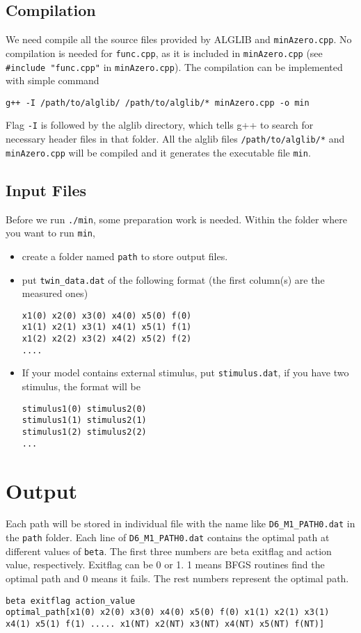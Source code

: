 \documentclass[11pt]{article}
\begin{document}
\subsection{Compilation}
We need compile all the source files provided by ALGLIB and \texttt{minAzero.cpp}.  No compilation is needed for \texttt{func.cpp}, as it is included in \texttt{minAzero.cpp} (see \texttt{\#include "func.cpp"} in \texttt{minAzero.cpp}). The compilation can be implemented with simple command 
\begin{verbatim}
g++ -I /path/to/alglib/ /path/to/alglib/* minAzero.cpp -o min
\end{verbatim}
Flag \texttt{-I} is followed by the alglib directory, which tells g++ to search for necessary header files in that folder. All the alglib files \texttt{/path/to/alglib/*} and \texttt{minAzero.cpp} will be compiled and it generates the executable file \texttt{min}.
\subsection{Input Files}
Before we run \texttt{./min}, some preparation work is needed. Within the folder where you want to run \texttt{min}, 
\begin{itemize}
\item create a folder named \texttt{path}  to store output files.
\item put \texttt{twin\_data.dat} of the following format (the first  column(s) are the measured ones)
\begin{verbatim}
x1(0) x2(0) x3(0) x4(0) x5(0) f(0)
x1(1) x2(1) x3(1) x4(1) x5(1) f(1)
x1(2) x2(2) x3(2) x4(2) x5(2) f(2)
....
\end{verbatim}
\item If your model contains external stimulus, put \texttt{stimulus.dat}, if you have two stimulus, the format will be
\begin{verbatim}
stimulus1(0) stimulus2(0) 
stimulus1(1) stimulus2(1) 
stimulus1(2) stimulus2(2)
...
\end{verbatim}
\end{itemize}
\section{Output}
Each path will be stored in individual file with the name like \texttt{D6\_M1\_PATH0.dat} in the \texttt{path} folder.  Each line of  \texttt{D6\_M1\_PATH0.dat} contains the optimal path at different values of \texttt{beta}. The first three numbers are beta exitflag and action value, respectively. Exitflag can be 0 or 1. 1 means BFGS routines find the optimal path and 0 means it fails. The rest numbers represent the optimal path.
\begin{verbatim}
beta exitflag action_value 
optimal_path[x1(0) x2(0) x3(0) x4(0) x5(0) f(0) x1(1) x2(1) x3(1) 
x4(1) x5(1) f(1) ..... x1(NT) x2(NT) x3(NT) x4(NT) x5(NT) f(NT)]
\end{verbatim}
\end{document}
